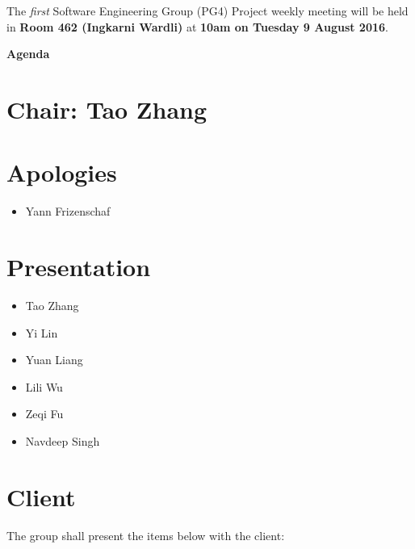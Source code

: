 \documentclass[11pt, a4paper]{article}
\begin{document}
\noindent The {\em first} Software Engineering Group (PG4) Project weekly meeting will be held in {\bf Room 462 (Ingkarni Wardli)} at {\bf 10am on Tuesday 9 August 2016}.


\vspace*{15pt}

\begin{center}
\huge \bf Agenda
\end{center}



\section*{Chair: Tao Zhang}

\vspace*{10pt}

\section{Apologies}
\begin{itemize}
\item Yann Frizenschaf
\end{itemize}


\section{Presentation}
\begin{itemize}
\item Tao Zhang
\item Yi Lin
\item Yuan Liang
\item Lili Wu
\item Zeqi Fu
\item Navdeep Singh
\end{itemize}

\section{Client}
The group shall present the items below with the client:
\end{document}
